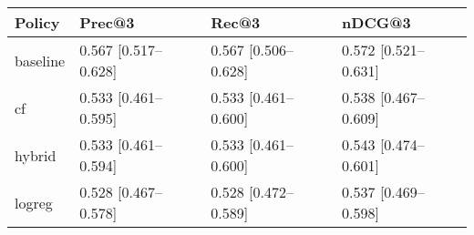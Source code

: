 \begin{tabular}{llll}
\toprule
Policy & Prec@3 & Rec@3 & nDCG@3 \\
\midrule
baseline & 0.567 [0.517–0.628] & 0.567 [0.506–0.628] & 0.572 [0.521–0.631] \\
cf & 0.533 [0.461–0.595] & 0.533 [0.461–0.600] & 0.538 [0.467–0.609] \\
hybrid & 0.533 [0.461–0.594] & 0.533 [0.461–0.600] & 0.543 [0.474–0.601] \\
logreg & 0.528 [0.467–0.578] & 0.528 [0.472–0.589] & 0.537 [0.469–0.598] \\
\bottomrule
\end{tabular}
